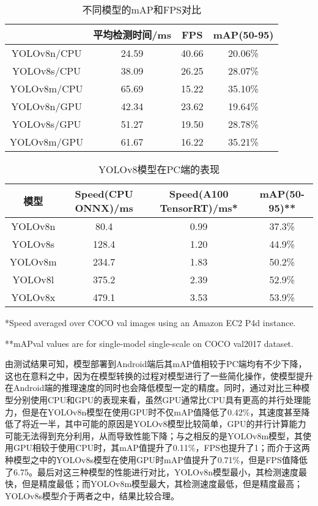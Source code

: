 \documentclass{ctexart}
\numberwithin{equation}{section}%
\numberwithin{figure}{section}%
\numberwithin{table}{section}%
\begin{document}
	\begin{table}[h]
		\centering
		\caption{不同模型的mAP和FPS对比}\label{b2}
		\begin{tabular}{c|c|c|c}
			\hline
			&  平均检测时间/ms \qquad & FPS \quad & mAP(50-95) \quad \\
			\hline 
			 YOLOv8n/CPU \quad & 24.59 & 40.66 & 20.06\% \\
		
			YOLOv8s/CPU &  38.09	& 26.25 &  28.07\% \\
			
				YOLOv8m/CPU & 65.69 & 15.22 & 35.10\% \\
		
			YOLOv8n/GPU &  42.34	& 23.62 &  19.64\% \\
			
				YOLOv8s/GPU & 51.27 & 19.50 & 28.78\% \\
			
			YOLOv8m/GPU &  61.67	& 16.22 & 35.21\% \\
			\hline
		\end{tabular}
	\end{table}

	\begin{table}[h]
		\centering
		\caption{YOLOv8模型在PC端的表现}\label{b5}
		\begin{tabular}{c|c|c|c}
			\hline
			模型&  Speed(CPU ONNX)/ms \qquad & Speed(A100 TensorRT)/ms* \quad & mAP(50-95)** \quad \\
			\hline 
			YOLOv8n \quad & 80.4 & 0.99 & 37.3\% \\
			
			YOLOv8s &  128.4	& 1.20 &  44.9\% \\
			
			YOLOv8m & 234.7 & 1.83 & 50.2\% \\
			
			YOLOv8l &  375.2	& 2.39 &  52.9\% \\
			
			YOLOv8x & 479.1 & 3.53 & 53.9\% \\
			\hline
		\end{tabular}
	\end{table}
	*Speed averaged over COCO val images using an Amazon EC2 P4d instance.
	
	**mAPval values are for single-model single-scale on COCO val2017 dataset.
	
	由测试结果可知，模型部署到Android端后其mAP值相较于PC端均有不少下降，这也在意料之中，因为在模型转换的过程对模型进行了一些简化操作，使模型提升在Android端的推理速度的同时也会降低模型一定的精度。同时，通过对比三种模型分别使用CPU和GPU的表现来看，虽然GPU通常比CPU具有更高的并行处理能力，但是在YOLOv8n模型在使用GPU时不仅mAP值降低了0.42\%，其速度甚至降低了将近一半，其中可能的原因是YOLOv8模型比较简单，GPU的并行计算能力可能无法得到充分利用，从而导致性能下降；与之相反的是YOLOv8m模型，其使用GPU相较于使用CPU时，其mAP值提升了0.11\%，FPS也提升了1；而介于这两种模型之中的YOLOv8s模型在使用GPU时mAP值提升了0.71\%，但是FPS值降低了6.75。最后对这三种模型的性能进行对比，YOLOv8n模型最小，其检测速度最快，但是精度最低；而YOLOv8m模型最大，其检测速度最低，但是精度最高；YOLOv8s模型介于两者之中，结果比较合理。
	
\end{document}

